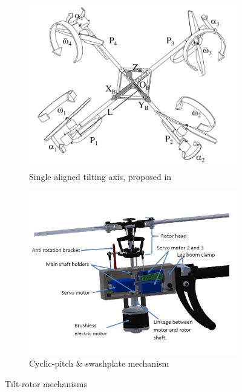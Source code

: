 \begin{figure}[htbp]
\centering
\begin{subfigure}{.5\textwidth}
\includegraphics[width=\textwidth]{figs/tiltpropellercontrol1}
\caption{Single aligned tilting axis, proposed in~\cite{tiltpropellercontrol}}
\label{fig:tiltpropellercontrol1}
\end{subfigure}%
\begin{subfigure}{.5\textwidth}
\includegraphics[width=\textwidth]{figs/napsholm-mech}
\caption{Cyclic-pitch \& swashplate mechanism}
\label{fig:tiltrotor-napsholm}
\end{subfigure}
\caption{Tilt-rotor mechanisms}
\label{fig:tiltprop}
\end{figure}
